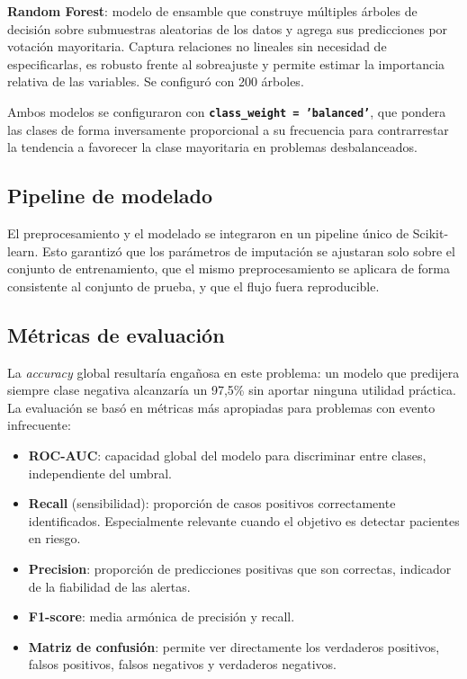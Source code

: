 \documentclass[12pt, a4paper, oneside]{report}
\begin{document}
\textbf{Random Forest}: modelo de ensamble que construye múltiples árboles de decisión sobre submuestras aleatorias de los datos y agrega sus predicciones por votación mayoritaria. Captura relaciones no lineales sin necesidad de especificarlas, es robusto frente al sobreajuste y permite estimar la importancia relativa de las variables. Se configuró con 200 árboles.

Ambos modelos se configuraron con \textbf{\texttt{class\_weight = 'balanced'}}, que pondera las clases de forma inversamente proporcional a su frecuencia para contrarrestar la tendencia a favorecer la clase mayoritaria en problemas desbalanceados.

\subsection{Pipeline de modelado}

El preprocesamiento y el modelado se integraron en un pipeline único de Scikit-learn. Esto garantizó que los parámetros de imputación se ajustaran solo sobre el conjunto de entrenamiento, que el mismo preprocesamiento se aplicara de forma consistente al conjunto de prueba, y que el flujo fuera reproducible.

\subsection{Métricas de evaluación}

La \textit{accuracy} global resultaría engañosa en este problema: un modelo que predijera siempre clase negativa alcanzaría un 97,5\% sin aportar ninguna utilidad práctica. La evaluación se basó en métricas más apropiadas para problemas con evento infrecuente:

\begin{itemize}
    \item \textbf{ROC-AUC}: capacidad global del modelo para discriminar entre clases, independiente del umbral.
    \item \textbf{Recall} (sensibilidad): proporción de casos positivos correctamente identificados. Especialmente relevante cuando el objetivo es detectar pacientes en riesgo.
    \item \textbf{Precision}: proporción de predicciones positivas que son correctas, indicador de la fiabilidad de las alertas.
    \item \textbf{F1-score}: media armónica de precisión y recall.
    \item \textbf{Matriz de confusión}: permite ver directamente los verdaderos positivos, falsos positivos, falsos negativos y verdaderos negativos.
\end{itemize}
\end{document}
